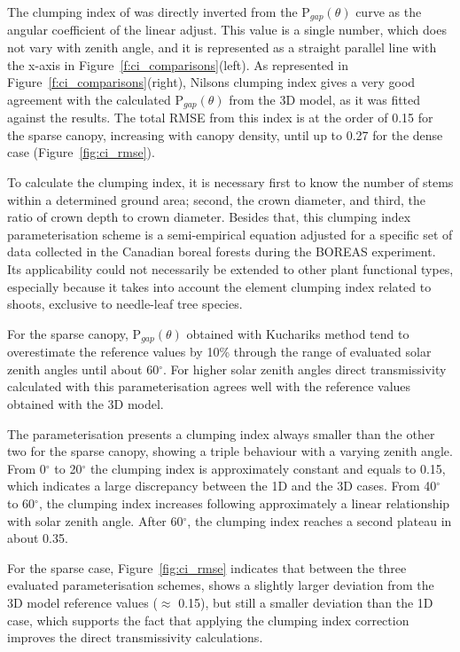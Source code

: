 The clumping index of \citet{Nilson1971} was directly inverted from the P$_{gap}(\theta)$ curve as the angular coefficient of the linear adjust. This value is a single number, which does not vary with zenith angle, and it is represented as a straight parallel line with the x-axis in Figure~\ref{f:ci_comparisons}(left). As represented in Figure~\ref{f:ci_comparisons}(right), Nilson\textquotesingle s clumping index gives a very good agreement with the calculated P$_{gap}(\theta)$ from the 3D model, as it was fitted against the results. The total RMSE from this index is at the order of 0.15 for the sparse canopy, increasing with canopy density, until up to 0.27 for the dense case (Figure~\ref{fig:ci_rmse}).

To calculate the \citet{Kucharik1999} clumping index, it is necessary first to know the number of stems within a determined ground area; second, the crown diameter, and third, the ratio of crown depth to crown diameter. Besides that, this clumping index parameterisation scheme is a semi-empirical equation adjusted for a specific set of data collected in the Canadian boreal forests during the BOREAS experiment. Its applicability could not necessarily be extended to other plant functional types, especially because it takes into account the element clumping index related to shoots, exclusive to needle-leaf tree species.

For the sparse canopy, P$_{gap}(\theta)$ obtained with Kucharik\textquotesingle s method tend to overestimate the reference values by 10\% through the range of evaluated solar zenith angles until about 60$^{\circ}$. For higher solar zenith angles direct transmissivity calculated with this parameterisation agrees well with the reference values obtained with the 3D model.

The \citet{Kucharik1999} parameterisation presents a clumping index always smaller than the other two for the sparse canopy, showing a triple behaviour with a varying zenith angle. From 0$^{\circ}$ to 20$^{\circ}$ the clumping index is approximately constant and equals to 0.15, which indicates a large discrepancy between the 1D and the 3D cases. From 40$^{\circ}$ to 60$^{\circ}$, the clumping index increases following approximately a linear relationship with solar zenith angle. After 60$^{\circ}$, the clumping index reaches a second plateau in about 0.35.

For the sparse case, Figure~\ref{fig:ci_rmse} indicates that between the three evaluated parameterisation schemes, \citet{Kucharik1999} shows a slightly larger deviation from the 3D model reference values ($\approx$ 0.15), but still a smaller deviation than the 1D case, which supports the fact that applying the clumping index correction improves the direct transmissivity calculations.

